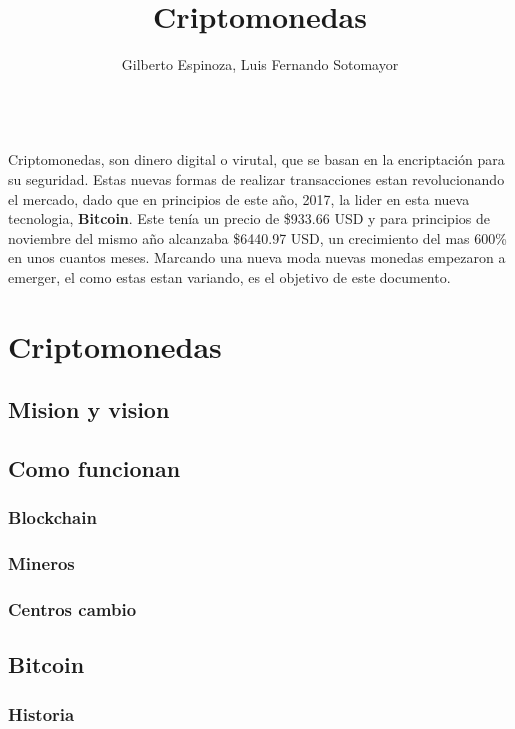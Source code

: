 \documentclass[12pt,letterpaper]{article}
\title{Criptomonedas}
\author{Gilberto Espinoza, Luis Fernando Sotomayor}
\begin{document}
\maketitle
\abstractname{\\Criptomonedas, son dinero digital o virutal, que se basan en la encriptaci\'on para su seguridad. Estas nuevas formas de realizar transacciones estan revolucionando el mercado, dado que en principios de este a\~no, 2017, la lider en esta nueva tecnologia, \textbf{Bitcoin}. Este ten\'ia un precio de \$933.66 USD y para principios de noviembre del mismo a\~no alcanzaba \$6440.97 USD, un crecimiento del mas 600\% en unos cuantos meses. Marcando una nueva moda nuevas monedas empezaron a emerger, el como estas estan variando, es el objetivo de este documento. }

\section*{Criptomonedas}

	\subsection*{Mision y vision}
	
	\subsection*{Como funcionan}
	
		\subsubsection*{Blockchain}
		
		\subsubsection*{Mineros}
		
		\subsubsection*{Centros cambio}
		
	\subsection*{Bitcoin}

        \subsubsection*{Historia}
\end{document}
